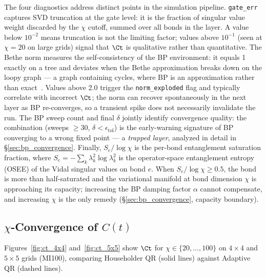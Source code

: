 The four diagnostics address distinct points in the simulation pipeline.
\texttt{gate\_err} captures SVD truncation at the gate level: it is the
fraction of singular value weight discarded by the $\chi$ cutoff, summed
over all bonds in the layer.
A value below $10^{-2}$ means truncation is not the limiting factor;
values above $10^{-1}$ (seen at $\chi=20$ on large grids) signal that
$\Ct$ is qualitative rather than quantitative.
The Bethe norm measures the self-consistency of the BP environment:
it equals 1 exactly on a tree and deviates when the Bethe approximation
breaks down on the loopy graph --- a graph containing cycles, where BP is an
approximation rather than exact~\citep{yedidia2005constructing}.
Values above 2.0 trigger the \texttt{norm\_exploded} flag and typically
correlate with incorrect $\Ct$; the norm can recover spontaneously in the
next layer as BP re-converges, so a transient spike does not necessarily
invalidate the run.
The BP sweep count and final $\delta$ jointly identify convergence quality:
the combination (sweeps $\geq 30$, $\delta < \epsilon_{\mathrm{tol}}$) is the
early-warning signature of BP converging to a wrong fixed point --- a
\emph{trapped layer}, analyzed in detail in \S\ref{sec:bp_convergence}.
Finally, $S_e / \log\chi$ is the per-bond entanglement saturation fraction,
where $S_e = -\sum_k \lambda_k^2 \log\lambda_k^2$ is the operator-space
entanglement entropy (OSEE) of the Vidal singular values on bond $e$.
When $S_e / \log\chi \geq 0.5$, the bond is more than half-saturated and
the variational manifold at bond dimension $\chi$ is approaching its capacity;
increasing the BP damping factor $\alpha$ cannot compensate, and increasing $\chi$ is the only remedy
(\S\ref{sec:bp_convergence}, capacity boundary).

\subsection{$\chi$-Convergence of $C(t)$}
\label{sec:chi_convergence}

Figures~\ref{fig:ct_4x4} and~\ref{fig:ct_5x5} show $\Ct$ for $\chi \in
\{20,\ldots,100\}$ on $4\times4$ and $5\times5$ grids (MI100), comparing
Householder QR (solid lines) against Adaptive QR (dashed lines).

